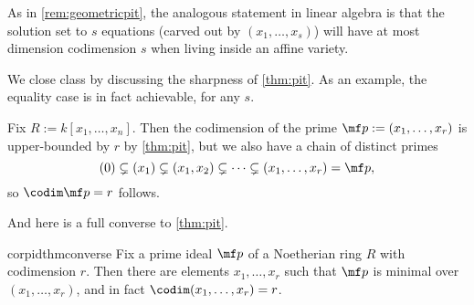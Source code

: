 \begin{remark}
	As in \autoref{rem:geometricpit}, the analogous statement in linear algebra is that the solution set to $s$ equations (carved out by $(x_1,\ldots,x_s)$) will have at most dimension codimension $s$ when living inside an affine variety.
\end{remark}
We close class by discussing the sharpness of \autoref{thm:pit}. As an example, the equality case is in fact achievable, for any $s$.
\begin{example}
	Fix $R:=k[x_1,\ldots,x_n]$. Then the codimension of the prime $\mf p:=(x_1,\ldots,x_r)$ is upper-bounded by $r$ by \autoref{thm:pit}, but we also have a chain of distinct primes
	\[(0)\subsetneq(x_1)\subsetneq(x_1,x_2)\subsetneq\cdots\subsetneq(x_1,\ldots,x_r)=\mf p,\]
	so $\codim\mf p=r$ follows.
\end{example}
And here is a full converse to \autoref{thm:pit}.
\begin{restatable}{cor}{pidthmconverse}
	Fix a prime ideal $\mf p$ of a Noetherian ring $R$ with codimension $r$. Then there are elements $x_1,\ldots,x_r$ such that $\mf p$ is minimal over $(x_1,\ldots,x_r)$, and in fact $\codim(x_1,\ldots,x_r)=r$.
\end{restatable}
